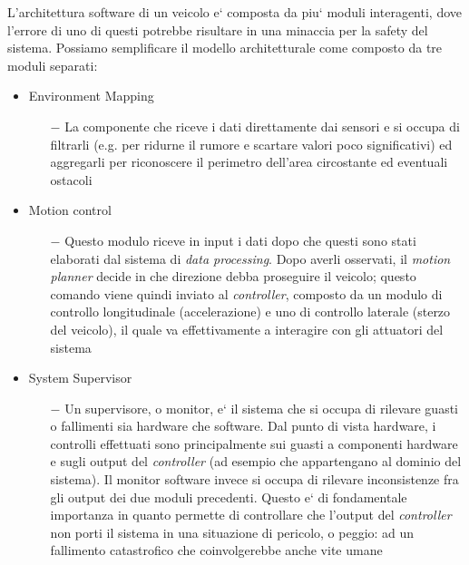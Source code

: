 \newpage

L'architettura software di un veicolo e` composta da piu` moduli interagenti, dove l'errore di uno di questi potrebbe risultare in una minaccia per la safety del sistema.\newline\newline
Possiamo semplificare il modello architetturale come composto da tre moduli separati:


\begin{itemize}
	\item Environment Mapping
	\begin{itemize}
		\item[$-$] La componente che riceve i dati direttamente dai sensori e si occupa di filtrarli (e.g. per ridurne il rumore e scartare valori poco significativi) ed aggregarli per riconoscere il perimetro dell'area circostante ed eventuali ostacoli
	\end{itemize}
	\item Motion control
	\begin{itemize}
		\item[$-$] Questo modulo riceve in input i dati dopo che questi sono stati elaborati dal sistema di \textsl{data processing}. Dopo averli osservati, il \textsl{motion planner} decide in che direzione debba proseguire il veicolo; questo comando viene quindi inviato al \textsl{controller}, composto da un modulo di controllo longitudinale (accelerazione) e uno di controllo laterale (sterzo del veicolo), il quale va effettivamente a interagire con gli attuatori del sistema
	\end{itemize}
	\item System Supervisor
	\begin{itemize}
		\item[$-$] Un supervisore, o monitor, e` il sistema che si occupa di rilevare guasti o fallimenti sia hardware che software. Dal punto di vista hardware, i controlli effettuati sono principalmente sui guasti a componenti hardware e sugli output del \textsl{controller} (ad esempio che appartengano al dominio del sistema). Il monitor software invece si occupa di rilevare inconsistenze fra gli output dei due moduli precedenti. Questo e` di fondamentale importanza in quanto permette di controllare che l'output del \textsl{controller} non porti il sistema in una situazione di pericolo, o peggio: ad un fallimento catastrofico che coinvolgerebbe anche vite umane
	\end{itemize}
\end{itemize}


